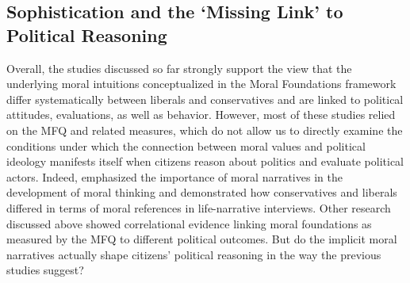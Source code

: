 \documentclass[12pt]{article}
\begin{document}
\subsection{Sophistication and the `Missing Link' to Political Reasoning}

Overall, the studies discussed so far strongly support the view that the underlying moral intuitions conceptualized in the Moral Foundations framework differ systematically between liberals and conservatives and are linked to political attitudes, evaluations, as well as behavior. However, most of these studies relied on the MFQ and related measures, which do not allow us to directly examine the conditions under which the connection between moral values and political ideology manifests itself when citizens reason about politics and evaluate political actors. Indeed, \citet{haidt2008moral} emphasized the importance of moral narratives in the development of moral thinking and \citet{mcadams2008family} demonstrated how conservatives and liberals differed in terms of moral references in life-narrative interviews. Other research discussed above showed correlational evidence linking moral foundations as measured by the MFQ to different political outcomes. But do the implicit moral narratives actually shape citizens' political reasoning in the way the previous studies suggest?
\end{document}
